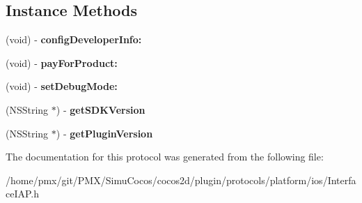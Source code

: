 \subsection*{Instance Methods}
\begin{DoxyCompactItemize}
\item 
\mbox{\label{protocolInterfaceIAP_01-p_a92be07957102c55d3e4bafbebcbf9afc}} 
(void) -\/ {\bfseries config\+Developer\+Info\+:}
\item 
\mbox{\label{protocolInterfaceIAP_01-p_abb031fba087197ec20ad733721c4f4e8}} 
(void) -\/ {\bfseries pay\+For\+Product\+:}
\item 
\mbox{\label{protocolInterfaceIAP_01-p_afef2889cfdf5bd3450e5c937180fbd6d}} 
(void) -\/ {\bfseries set\+Debug\+Mode\+:}
\item 
\mbox{\label{protocolInterfaceIAP_01-p_a96cd64f433f6447886a1e5dd04f07519}} 
(N\+S\+String $\ast$) -\/ {\bfseries get\+S\+D\+K\+Version}
\item 
\mbox{\label{protocolInterfaceIAP_01-p_ae3d881cd503b8762f5171ca3a55dcb40}} 
(N\+S\+String $\ast$) -\/ {\bfseries get\+Plugin\+Version}
\end{DoxyCompactItemize}


The documentation for this protocol was generated from the following file\+:\begin{DoxyCompactItemize}
\item 
/home/pmx/git/\+P\+M\+X/\+Simu\+Cocos/cocos2d/plugin/protocols/platform/ios/Interface\+I\+A\+P.\+h\end{DoxyCompactItemize}
